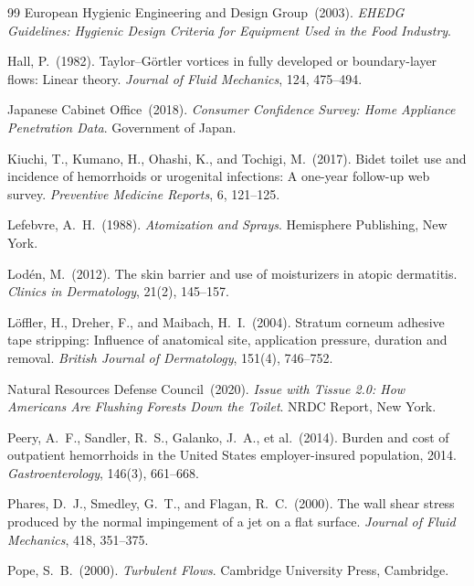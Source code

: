 \documentclass[aps,prfluids,reprint,amsmath,amssymb,floatfix]{revtex4-2}
\begin{document}
\begin{thebibliography}{99}
European Hygienic Engineering and Design Group\ (2003).
\textit{EHEDG Guidelines: Hygienic Design Criteria for Equipment Used in
the Food Industry}.

Hall, P.\ (1982).
Taylor--G\"{o}rtler vortices in fully developed or boundary-layer flows:
Linear theory.
\textit{Journal of Fluid Mechanics}, 124, 475--494.

Japanese Cabinet Office\ (2018).
\textit{Consumer Confidence Survey: Home Appliance Penetration Data}.
Government of Japan.

Kiuchi, T., Kumano, H., Ohashi, K., and Tochigi, M.\ (2017).
Bidet toilet use and incidence of hemorrhoids or urogenital infections:
A one-year follow-up web survey.
\textit{Preventive Medicine Reports}, 6, 121--125.

Lefebvre, A.~H.\ (1988).
\textit{Atomization and Sprays}.
Hemisphere Publishing, New York.

Lod\'{e}n, M.\ (2012).
The skin barrier and use of moisturizers in atopic dermatitis.
\textit{Clinics in Dermatology}, 21(2), 145--157.

L\"{o}ffler, H., Dreher, F., and Maibach, H.~I.\ (2004).
Stratum corneum adhesive tape stripping: Influence of anatomical site,
application pressure, duration and removal.
\textit{British Journal of Dermatology}, 151(4), 746--752.

Natural Resources Defense Council\ (2020).
\textit{Issue with Tissue 2.0: How Americans Are Flushing Forests Down
the Toilet}.
NRDC Report, New York.

Peery, A.~F., Sandler, R.~S., Galanko, J.~A., et al.\ (2014).
Burden and cost of outpatient hemorrhoids in the United States
employer-insured population, 2014.
\textit{Gastroenterology}, 146(3), 661--668.

Phares, D.~J., Smedley, G.~T., and Flagan, R.~C.\ (2000).
The wall shear stress produced by the normal impingement of a jet on a flat
surface.
\textit{Journal of Fluid Mechanics}, 418, 351--375.

Pope, S.~B.\ (2000).
\textit{Turbulent Flows}.
Cambridge University Press, Cambridge.


\end{thebibliography}
\end{document}
